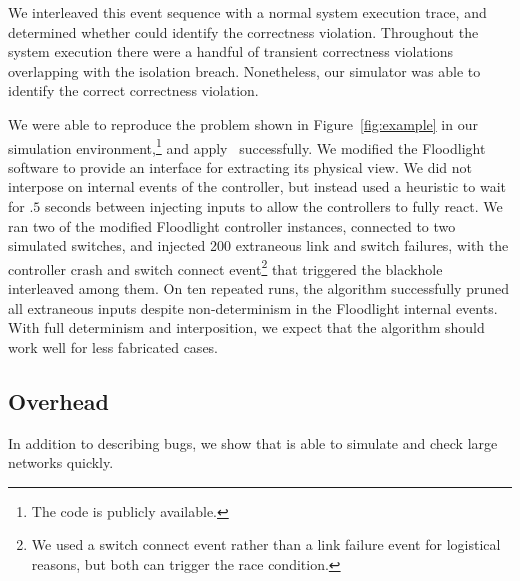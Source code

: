 {We interleaved this event sequence with a normal system execution trace, and
determined whether \projectname{} could identify the correctness violation.
Throughout the system execution there were a handful of transient
correctness violations overlapping with the isolation breach. Nonetheless, our
simulator was able to identify the correct correctness violation.

We were able to reproduce the problem shown in Figure~\ref{fig:example} in our
simulation environment,\footnote{The code is publicly available.}
and apply \projectname~successfully.
We modified the Floodlight software to provide an interface for extracting its
physical view. We did not interpose on internal events of the controller, but instead used a
heuristic to wait for $.5$ seconds between injecting inputs to allow the
controllers to fully react. We ran two of the modified Floodlight controller
instances, connected to two simulated switches, and injected 200 extraneous link
and switch failures, with the controller crash and switch connect event\footnote{We used a switch connect
event rather than a link failure event for logistical reasons, but both
can trigger the race condition.} that triggered the blackhole interleaved among them.
On ten repeated runs, the algorithm successfully pruned all extraneous
inputs despite non-determinism in the Floodlight internal events. With full determinism and
interposition, we expect that the algorithm should work well for less
fabricated cases.

\subsection{Overhead}


In addition to describing bugs, we show that \projectname{} is able
to simulate and check large networks quickly.

}
